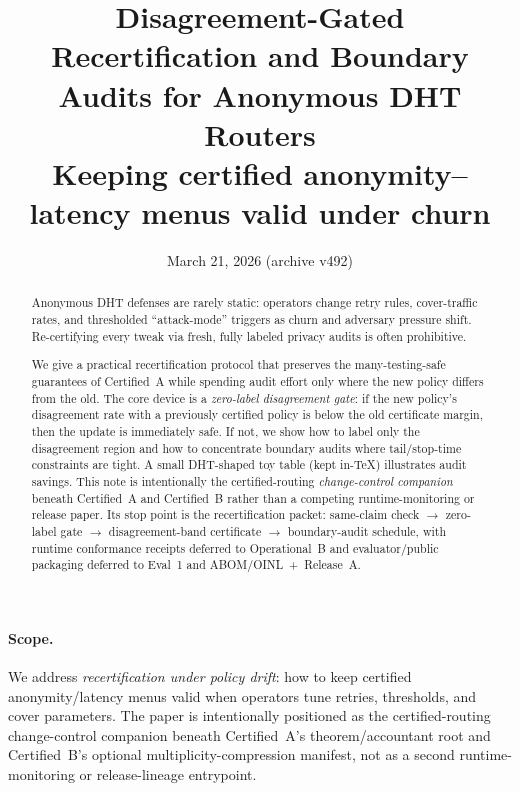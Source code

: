 \documentclass[11pt]{article}
\title{\textbf{Disagreement-Gated Recertification and Boundary Audits for Anonymous DHT Routers}\\
\large Keeping certified anonymity--latency menus valid under churn}
\author{}
\date{March 21, 2026 (archive v492)}
\begin{document}
\maketitle

\begin{abstract}
Anonymous DHT defenses are rarely static: operators change retry rules, cover-traffic rates, and thresholded ``attack-mode'' triggers as churn and adversary pressure shift.
Re-certifying every tweak via fresh, fully labeled privacy audits is often prohibitive.

We give a practical recertification protocol that preserves the many-testing-safe guarantees of Certified~A while spending audit effort only where the new policy differs from the old.
The core device is a \emph{zero-label disagreement gate}: if the new policy's disagreement rate with a previously certified policy is below the old certificate margin, then the update is immediately safe.
If not, we show how to label only the disagreement region and how to concentrate boundary audits where tail/stop-time constraints are tight.
A small DHT-shaped toy table (kept in-\TeX) illustrates audit savings. This note is intentionally the certified-routing \emph{change-control companion} beneath Certified~A and Certified~B rather than a competing runtime-monitoring or release paper. Its stop point is the recertification packet: same-claim check $\rightarrow$ zero-label gate $\rightarrow$ disagreement-band certificate $\rightarrow$ boundary-audit schedule, with runtime conformance receipts deferred to Operational~B and evaluator/public packaging deferred to Eval~1 and ABOM/OINL~+~Release~A.
\end{abstract}


\paragraph{Scope.}
We address \emph{recertification under policy drift}: how to keep certified anonymity/latency menus valid when operators tune retries, thresholds, and cover parameters. The paper is intentionally positioned as the certified-routing change-control companion beneath Certified~A's theorem/accountant root and Certified~B's optional multiplicity-compression manifest, not as a second runtime-monitoring or release-lineage entrypoint.
\end{document}
